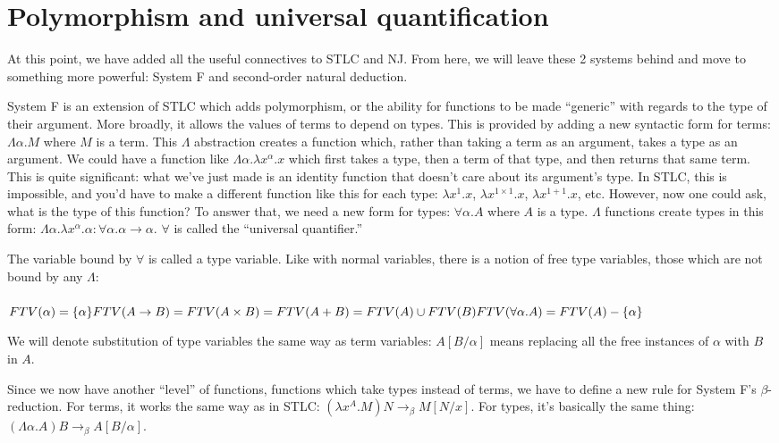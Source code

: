 \documentclass[12pt]{article}
\begin{document}
\section{Polymorphism and universal quantification}

At this point, we have added all the useful connectives to STLC and NJ. From here, we will leave these 2 systems behind and move to something more powerful: System F and second-order natural deduction.

System F is an extension of STLC which adds polymorphism, or the ability for functions to be made ``generic'' with regards to the type of their argument. More broadly, it allows the values of terms to depend on types. This is provided by adding a new syntactic form for terms: $\Lambda \alpha. M$ where $M$ is a term. This $\Lambda$ abstraction creates a function which, rather than taking a term as an argument, takes a type as an argument. We could have a function like $\Lambda \alpha. \lambda x^\alpha. x$ which first takes a type, then a term of that type, and then returns that same term. This is quite significant: what we've just made is an identity function that doesn't care about its argument's type. In STLC, this is impossible, and you'd have to make a different function like this for each type: $\lambda x^1.x$, $\lambda x^{1 \times 1}.x$, $\lambda x^{1+1}.x$, etc. However, now one could ask, what is the type of this function? To answer that, we need a new form for types: $\forall \alpha. A$ where $A$ is a type. $\Lambda$ functions create types in this form: $\Lambda \alpha. \lambda x^\alpha. \alpha: \forall \alpha. \alpha \to \alpha$. $\forall$ is called the ``universal quantifier.''

The variable bound by $\forall$ is called a type variable. Like with normal variables, there is a notion of free type variables, those which are not bound by any $\Lambda$: \\
\\
$FTV(\alpha) = \{\alpha\} \\
FTV(A \to B) = FTV(A \times B) = FTV(A + B) = FTV(A) \cup FTV(B) \\
FTV(\forall \alpha. A) = FTV(A) - \{\alpha\} \\$

We will denote substitution of type variables the same way as term variables: $A[B/\alpha]$ means replacing all the free instances of $\alpha$ with $B$ in $A$.

Since we now have another ``level'' of functions, functions which take types instead of terms, we have to define a new rule for System F's $\beta$-reduction. For terms, it works the same way as in STLC: $(\lambda x^A.M)N \to_\beta M[N/x]$. For types, it's basically the same thing: $(\Lambda \alpha.A)B \to_\beta A[B/\alpha]$.
\end{document}
